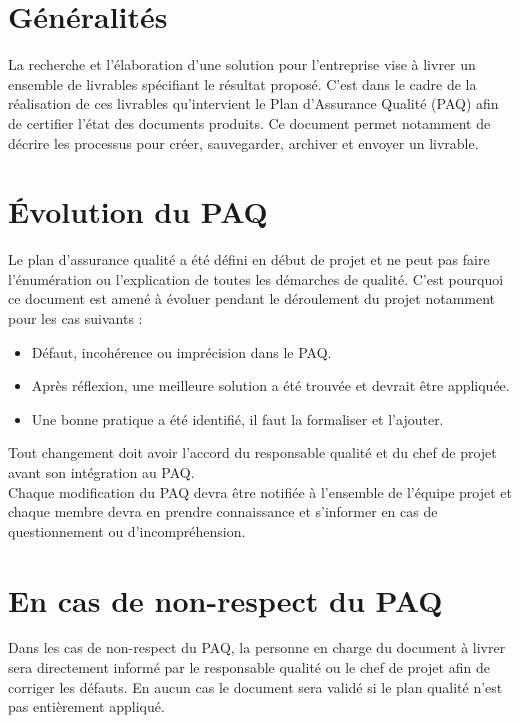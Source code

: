 
\section{Généralités}

La recherche et l’élaboration d’une solution pour l’entreprise vise à livrer un ensemble de livrables spécifiant le résultat proposé. C’est dans le cadre de la réalisation de ces livrables qu’intervient le Plan d'Assurance Qualité (PAQ) afin de certifier l’état des documents produits. Ce document permet notamment de décrire les processus pour créer, sauvegarder, archiver et envoyer un livrable.

\section{Évolution du PAQ}

Le plan d’assurance qualité a été défini en début de projet et ne peut pas faire l’énumération ou l’explication de toutes les démarches de qualité. C’est pourquoi ce document est amené à évoluer pendant le déroulement du projet notamment pour les cas suivants : \\

\begin{itemize}
    \item[\textbullet] Défaut, incohérence ou imprécision dans le PAQ.
    \item[\textbullet] Après réflexion, une meilleure solution a été trouvée et devrait être appliquée.
    \item[\textbullet] Une bonne pratique a été identifié, il faut la formaliser et l’ajouter. \\
\end{itemize}

Tout changement doit avoir l’accord du responsable qualité et du chef de projet avant son intégration au PAQ. \\

Chaque modification du PAQ devra être notifiée à l’ensemble de l’équipe projet et chaque membre devra en prendre connaissance et s’informer en cas de questionnement ou d’incompréhension.
    
\section{En cas de non-respect du PAQ}
    
Dans les cas de non-respect du PAQ, la personne en charge du document à livrer sera directement informé par le responsable qualité ou le chef de projet afin de corriger les défauts. En aucun cas le document sera validé si le plan qualité n’est pas entièrement appliqué. \\

